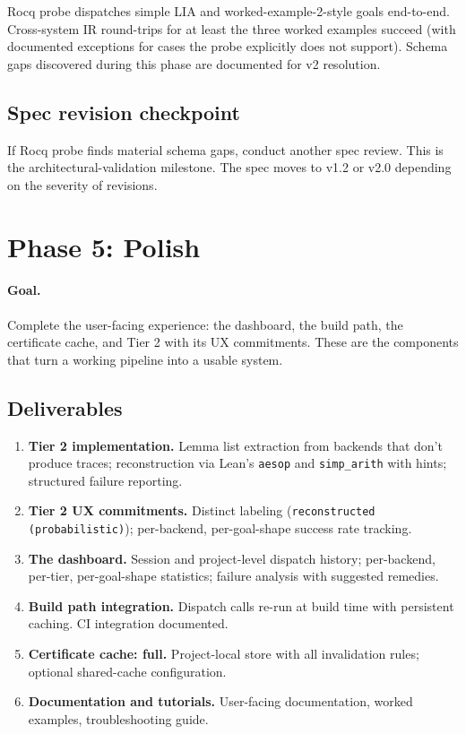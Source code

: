 \documentclass[11pt,letterpaper]{article}
\begin{document}
Rocq probe dispatches simple LIA and worked-example-2-style goals
end-to-end. Cross-system IR round-trips for at least the three worked
examples succeed (with documented exceptions for cases the probe
explicitly does not support). Schema gaps discovered during this phase
are documented for v2 resolution.

\subsection{Spec revision checkpoint}

If Rocq probe finds material schema gaps, conduct another spec review.
This is the architectural-validation milestone. The spec moves to v1.2
or v2.0 depending on the severity of revisions.

\section{Phase 5: Polish}
\label{sec:phase5}

\paragraph{Goal.} Complete the user-facing experience: the dashboard,
the build path, the certificate cache, and Tier 2 with its UX
commitments. These are the components that turn a working pipeline
into a usable system.

\subsection{Deliverables}

\begin{enumerate}
  \item \textbf{Tier 2 implementation.} Lemma list extraction from
        backends that don't produce traces; reconstruction via Lean's
        \texttt{aesop} and \texttt{simp\_arith} with hints; structured
        failure reporting.
  \item \textbf{Tier 2 UX commitments.} Distinct labeling
        (\texttt{reconstructed (probabilistic)}); per-backend, per-goal-shape
        success rate tracking.
  \item \textbf{The dashboard.} Session and project-level dispatch
        history; per-backend, per-tier, per-goal-shape statistics;
        failure analysis with suggested remedies.
  \item \textbf{Build path integration.} Dispatch calls re-run at build
        time with persistent caching. CI integration documented.
  \item \textbf{Certificate cache: full.} Project-local store with all
        invalidation rules; optional shared-cache configuration.
  \item \textbf{Documentation and tutorials.} User-facing documentation,
        worked examples, troubleshooting guide.
\end{enumerate}
\end{document}
